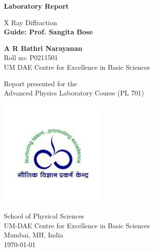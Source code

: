 \begin{titlepage}
	\begin{center}
		\vspace*{1cm}
		
		\Huge
		\textbf{Laboratory Report}
		
		\vspace{0.5cm}
		\LARGE
		X Ray Diffraction\\
		\vspace{0.5cm}
		\textbf{Guide: Prof. Sangita Bose}
		
		\vspace{1.5cm}
		
		\textbf{A R Bathri Narayanan}\\
		Roll no: P0211501\\
		UM DAE Centre for Excellence in Basic Sciences
		
		\vspace{3 cm}
		
		Report presented for the\\
		Advanced Physics Laboratory Course (PL 701)
		
		\vspace{0.8cm}
		
		\includegraphics[width=0.4\textwidth]{cebs.jpg}
		
		\Large
		School of Physical Sciences\\
		UM-DAE Centre for Excellence in Basic Sciences\\
		Mumbai, MH, India\\
		\today
		
	\end{center}
\end{titlepage}